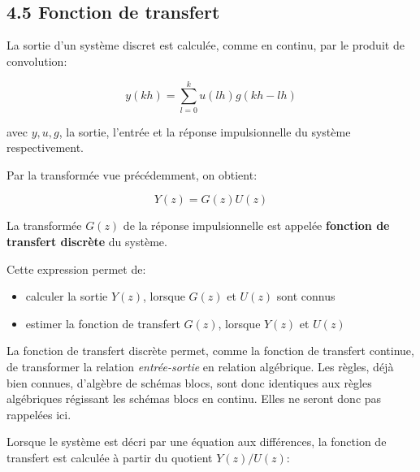 \documentclass[11pt]{article}
\providecommand{\tightlist}{%
      \setlength{\itemsep}{0pt}\setlength{\parskip}{0pt}}
\begin{document}
    \begin{center}
    \end{center}
    { \hspace*{\fill} \\}
    
    \begin{center}
    \end{center}
    { \hspace*{\fill} \\}
    
    \subsection{4.5 Fonction de transfert}\label{fonction-de-transfert}

    La sortie d'un système discret est calculée, comme en continu, par le
produit de convolution:

\[ y(kh) = \sum_{l=0}^{k}u(lh)g(kh-lh) \]

avec \(y, u, g\), la sortie, l'entrée et la réponse impulsionnelle du
système respectivement.

    Par la transformée vue précédemment, on obtient:

\[ Y(z) = G(z)U(z) \]

La transformée \(G(z)\) de la réponse impulsionnelle est appelée
\textbf{fonction de transfert discrète} du système.

    Cette expression permet de:

\begin{itemize}
\tightlist
\item
  calculer la sortie \(Y(z)\), lorsque \(G(z)\) et \(U(z)\) sont connus
\item
  estimer la fonction de transfert \(G(z)\), lorsque \(Y(z)\) et
  \(U(z)\)
\end{itemize}

    La fonction de transfert discrète permet, comme la fonction de transfert
continue, de transformer la relation \emph{entrée-sortie} en relation
algébrique. Les règles, déjà bien connues, d'algèbre de schémas blocs,
sont donc identiques aux règles algébriques régissant les schémas blocs
en continu. Elles ne seront donc pas rappelées ici.

    Lorsque le système est décri par une équation aux différences, la
fonction de transfert est calculée à partir du quotient \(Y(z)/U(z)\):
\end{document}

